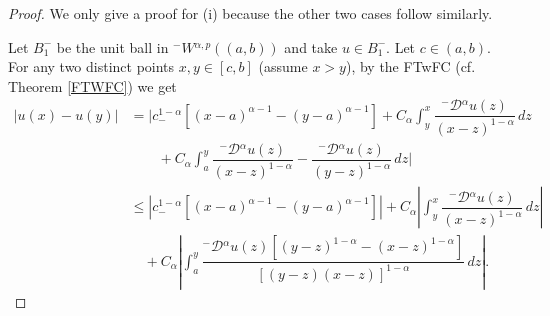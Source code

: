 \documentclass[leqno,final]{siamltex}
\numberwithin{equation}{section}
\renewcommand{\(}{\bigl(}
\renewcommand{\)}{\bigr)}
\begin{document}
    \begin{proof}
         We only give a proof for (i) because the other two cases follow similarly. 
       
       Let ${B}_1^-$ be the unit ball in ${^{-}}{W}{^{\alpha,p}}((a,b))$ and take $u \in {B}_1^-$. Let $c \in (a,b)$. For any two distinct points $x,y \in [c,b]$ (assume $x>y$), by the FTwFC (cf. Theorem \ref{FTWFC}) we get 
        \begin{align}\label{a1}
             \bigl|u (x) - u (y)\bigr| 
            &= \biggl|c_{-}^{1-\alpha} [(x-a)^{\alpha -1} - (y-a)^{\alpha -1}] + C_{\alpha} \int_{y}^{x} \dfrac{{^{-}}{\mathcal{D}}{^{\alpha}}u(z)}{(x-z)^{1-\alpha}}\,dz \\
            &\qquad  + C_{\alpha} \int_{a}^{y} \dfrac{{^{-}}{\mathcal{D}}{^{\alpha}}u(z)}{(x-z)^{1-\alpha}} - \dfrac{{^{-}}{\mathcal{D}}{^{\alpha}} u(z)}{(y-z)^{1-\alpha}}\,dz \biggr| \nonumber \\
            &\leq \left|c_{-}^{1-\alpha} [(x-a)^{\alpha -1} - (y-a)^{\alpha -1}]\right| + C_{\alpha} \left|\int_{y}^{x} \dfrac{{^{-}}{\mathcal{D}}{^{\alpha}}u(z)}{(x-z)^{1-\alpha}}\,dz \right| \nonumber \\
            &\quad  + C_{\alpha} \left| \int_{a}^{y} \dfrac{{^{-}}{\mathcal{D}}{^{\alpha}} u(z) [ (y-z)^{1-\alpha} - (x-z)^{1-\alpha}]}{[(y-z)(x-z)]^{1 - \alpha}}\,dz\right|. \nonumber
            \end{align}
            

\end{proof}
\end{document}
